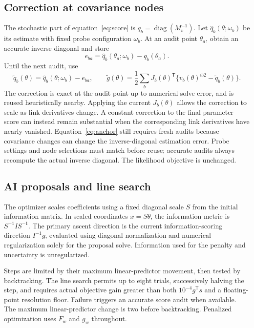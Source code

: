 \documentclass[11pt]{article}
\newcommand{\diag}{\operatorname{diag}}
\begin{document}
\subsection{Correction at covariance nodes}
The stochastic part of equation~\eqref{eq:score} is $q_b=\diag(M_b^{-1})$. Let $\widehat q_b(\theta;\omega_b)$ be its estimate with fixed probe configuration $\omega_b$. At an audit point $\theta_a$, obtain an accurate inverse diagonal and store
\begin{equation}
 e_{ba}=\widehat q_b(\theta_a;\omega_b)-q_b(\theta_a).
\end{equation}
Until the next audit, use
\begin{equation}
 \widetilde q_b(\theta)=\widehat q_b(\theta;\omega_b)-e_{ba},\qquad
 \widetilde g(\theta)=\frac12\sum_bJ_b(\theta)^\mathsf{T}
 \{v_b(\theta)^{\odot2}-\widetilde q_b(\theta)\}.
 \label{eq:anchor}
\end{equation}
The correction is exact at the audit point up to numerical solve error, and is reused heuristically nearby. Applying the current $J_b(\theta)$ allows the correction to scale as link derivatives change. A constant correction to the final parameter score can instead remain substantial when the corresponding link derivatives have nearly vanished. Equation~\eqref{eq:anchor} still requires fresh audits because covariance changes can change the inverse-diagonal estimation error. Probe settings and node selections must match before reuse; accurate audits always recompute the actual inverse diagonal. The likelihood objective is unchanged.

\subsection{AI proposals and line search}
The optimizer scales coefficients using a fixed diagonal scale $S$ from the initial information matrix. In scaled coordinates $x=S\theta$, the information metric is $S^{-1}IS^{-1}$. The primary ascent direction is the current information-scoring direction $I^{-1}g$, evaluated using diagonal normalization and numerical regularization solely for the proposal solve. Information used for the penalty and uncertainty is unregularized.

Steps are limited by their maximum linear-predictor movement, then tested by backtracking. The line search permits up to eight trials, successively halving the step, and requires actual objective gain greater than both $10^{-4}g^\mathsf{T}s$ and a floating-point resolution floor. Failure triggers an accurate score audit when available. The maximum linear-predictor change is two before backtracking. Penalized optimization uses $F_w$ and $g_w$ throughout.
\end{document}
